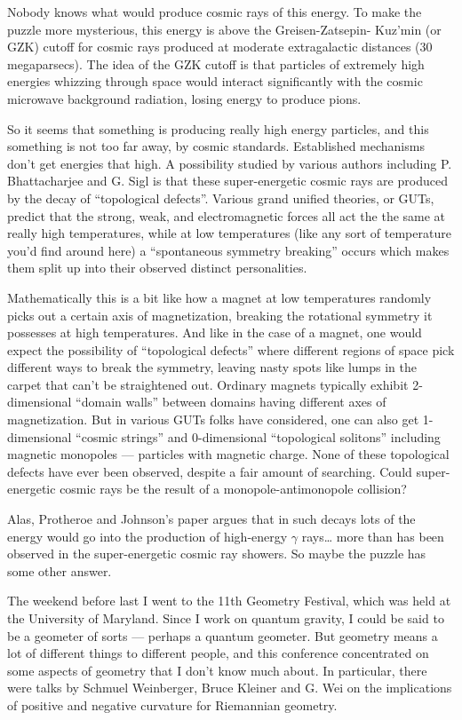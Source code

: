 \documentclass{article}
\begin{document}
Nobody knows what would produce cosmic rays of this energy. To make the
puzzle more mysterious, this energy is above the Greisen-Zatsepin-
Kuz'min (or GZK) cutoff for cosmic rays produced at moderate
extragalactic distances (30 megaparsecs). The idea of the GZK cutoff is
that particles of extremely high energies whizzing through space would
interact significantly with the cosmic microwave background radiation,
losing energy to produce pions.

So it seems that something is producing really high energy particles,
and this something is not too far away, by cosmic standards. Established
mechanisms don't get energies that high. A possibility studied by
various authors including P. Bhattacharjee and G. Sigl is that these
super-energetic cosmic rays are produced by the decay of ``topological
defects''. Various grand unified theories, or GUTs, predict that the
strong, weak, and electromagnetic forces all act the the same at really
high temperatures, while at low temperatures (like any sort of
temperature you'd find around here) a ``spontaneous symmetry breaking''
occurs which makes them split up into their observed distinct
personalities.

Mathematically this is a bit like how a magnet at low temperatures
randomly picks out a certain axis of magnetization, breaking the
rotational symmetry it possesses at high temperatures. And like in the
case of a magnet, one would expect the possibility of ``topological
defects'' where different regions of space pick different ways to break
the symmetry, leaving nasty spots like lumps in the carpet that can't be
straightened out. Ordinary magnets typically exhibit 2-dimensional
``domain walls'' between domains having different axes of magnetization.
But in various GUTs folks have considered, one can also get
1-dimensional ``cosmic strings'' and 0-dimensional ``topological
solitons'' including magnetic monopoles --- particles with magnetic
charge. None of these topological defects have ever been observed,
despite a fair amount of searching. Could super-energetic cosmic rays be
the result of a monopole-antimonopole collision?

Alas, Protheroe and Johnson's paper argues that in such decays lots of
the energy would go into the production of high-energy \(\gamma\)
rays\ldots{} more than has been observed in the super-energetic cosmic
ray showers. So maybe the puzzle has some other answer.

The weekend before last I went to the 11th Geometry Festival, which was
held at the University of Maryland. Since I work on quantum gravity, I
could be said to be a geometer of sorts --- perhaps a quantum geometer.
But geometry means a lot of different things to different people, and
this conference concentrated on some aspects of geometry that I don't
know much about. In particular, there were talks by Schmuel Weinberger,
Bruce Kleiner and G. Wei on the implications of positive and negative
curvature for Riemannian geometry.
\end{document}
